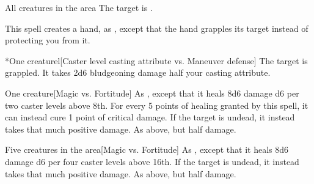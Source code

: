 \spelldur{\durmed}
\begin{spelltargets}{All creatures in the area}
    The target is \vulnerable.
\end{spelltargets}

\spellrng{\rngmed}
\spelldur{\durshort \dismissable}
\spellline
\spelleffect This spell creates a hand, as , except that the hand grapples its target instead of protecting you from it.
\begin{spelltarget}*{One creature}l[Caster level \add casting attribute vs. Maneuver defense]
    \spellsuccess The target is grappled. It takes 2d6 bludgeoning damage \add half your casting attribute.
\end{spelltarget}

\spellrng{\rngclose}
\begin{spelltarget}{One creature}[Magic vs. Fortitude]
    \spelleffect As , except that it heals 8d6 damage \add d6 per two caster levels above 8th. For every 5 points of healing granted by this spell, it can instead cure 1 point of critical damage.
    \spellsuccess If the target is undead, it instead takes that much positive damage.
    \spellfailure As above, but half damage.
\end{spelltarget}

\spellrng{\rngclose}
\begin{spelltargets}{Five creatures in the area}[Magic vs. Fortitude]
    \spelleffect As , except that it heals 8d6 damage \add d6 per four caster levels above 16th.
    \spellsuccess If the target is undead, it instead takes that much positive damage.
    \spellfailure As above, but half damage.
\end{spelltargets}

